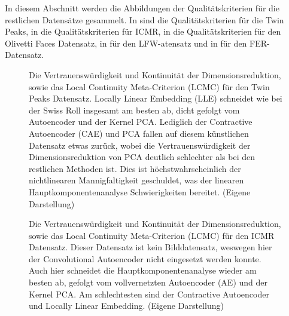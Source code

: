 In diesem Abschnitt werden die Abbildungen der Qualitätskriterien für die restlichen Datensätze
gesammelt. In  sind die Qualitätskriterien für die Twin Peaks, in
 die Qualitätskriterien für ICMR, in  die
Qualitätskriterien für den Olivetti Faces Datensatz, in  für den
LFW-atensatz und in  für den FER-Datensatz.
\begin{figure}[ht]
	\begin{center}
		
	\end{center}
	\caption[Qualitätskriterien für die Twin Peaks]{Die Vertrauenswürdigkeit und Kontinuität der Dimensionsreduktion, sowie das Local Continuity Meta-Criterion (LCMC) für den Twin Peaks Datensatz. Locally Linear Embedding (LLE) schneidet wie bei der Swiss Roll insgesamt am besten ab, dicht gefolgt vom Autoencoder und der Kernel PCA. Lediglich der Contractive Autoencoder (CAE) und PCA fallen auf diesem künstlichen Datensatz etwas zurück, wobei die Vertrauenswürdigkeit der Dimensionsreduktion von PCA deutlich schlechter als bei den restlichen Methoden ist. Dies ist höchstwahrscheinlich der nichtlinearen Mannigfaltigkeit geschuldet, was der linearen Hauptkomponentenanalyse Schwierigkeiten bereitet. (Eigene Darstellung)}
	\label{fig:TwinPeaksMetrics}
\end{figure}

\begin{figure}[ht]
	\begin{center}
		
	\end{center}
	\caption[Qualitätskriterien für den ICMR-Datensatz]{Die Vertrauenswürdigkeit und Kontinuität der Dimensionsreduktion, sowie das Local Continuity Meta-Criterion (LCMC) für den ICMR Datensatz. Dieser Datensatz ist kein Bilddatensatz, weswegen hier der Convolutional Autoencoder nicht eingesetzt werden konnte. Auch hier schneidet die Hauptkomponentenanalyse wieder am besten ab, gefolgt vom vollvernetzten Autoencoder (AE) und der Kernel PCA. Am schlechtesten sind der Contractive Autoencoder und Locally Linear Embedding. (Eigene Darstellung)}
	\label{fig:ICMRMetrics}
\end{figure}


